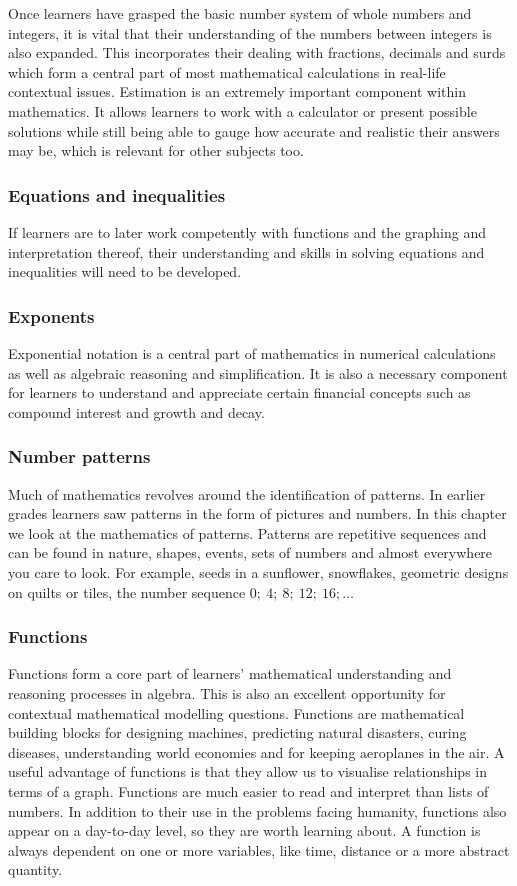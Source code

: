 Once learners have grasped the basic number system of whole numbers and integers, it is vital that their understanding of the numbers between integers is also expanded. This incorporates their dealing with fractions, decimals and surds which form a central part of most mathematical calculations in real-life contextual issues. Estimation is an extremely important component within mathematics. It allows learners to work with a calculator or present possible solutions while still being able to gauge how accurate and realistic their answers may be, which is relevant for other subjects too. 

\subsubsection{Equations and inequalities}
If learners are to later work competently with functions and the graphing and interpretation thereof, their understanding and skills in solving equations and inequalities will need to be developed. 
\subsubsection{Exponents}
Exponential notation is a central part of mathematics in numerical calculations as well as algebraic reasoning and simplification. It is also a necessary component for learners to understand and appreciate certain financial concepts such as compound interest and growth and decay. 
\subsubsection{Number patterns}
Much of mathematics revolves around the identification of patterns. In earlier grades learners saw patterns in the form of pictures and numbers. In this chapter  we look at the mathematics of patterns. Patterns are repetitive sequences and can be found in nature, shapes, events, sets of numbers and almost everywhere you care to look. For example, seeds in a sunflower, snowflakes, geometric designs on quilts or tiles, the number sequence $0; ~4;~ 8;~ 12; ~16; \ldots$
\subsubsection{Functions}
Functions form a core part of learners’ mathematical understanding and reasoning processes in algebra. This is also an excellent opportunity for contextual mathematical modelling questions. Functions are mathematical building blocks for designing machines, predicting natural disasters, curing diseases, understanding world economies and for keeping aeroplanes in the air. A useful advantage of functions is that they allow us to visualise relationships in terms of a graph. Functions are much easier to read and interpret than lists of numbers. In addition to their use in the problems facing humanity, functions also appear on a day-to-day level, so they are worth learning about. A function is always dependent on one or more variables, like time, distance or a more abstract  quantity.
